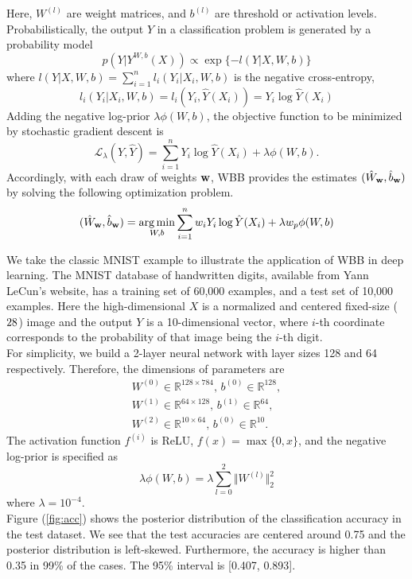 \documentclass[11pt]{article}%
\DeclareMathOperator*{\argmin}{arg\,min} %
\begin{document}
\noindent Here, $W^{(l)}$ are weight matrices, and $b^{(l)}$ are threshold or activation levels. Probabilistically, the output $Y$ in a classification problem is generated by a probability model 
$$
p(Y|Y^{W,b}(X)) \propto \exp\{-l(Y|X,W,b)\}
$$
where $l(Y|X,W,b) = \sum_{i=1}^{n}l_i(Y_i|X_i,W,b) $ is the  negative cross-entropy,
$$
l_i(Y_i|X_i,W,b) = l_i(Y_i, \hat{Y}(X_i)) = Y_i\log\hat{Y}(X_i)
$$
Adding the negative log-prior $\lambda\phi(W,b)$, the objective function to be minimized by stochastic gradient descent is 
$$
\mathcal{L}_\lambda(Y,\hat{Y}) = \sum_{i=1}^{n}Y_i\log\hat{Y}(X_i) + \lambda\phi(W,b).
$$
Accordingly, with each draw of weights ${\bf w}$, WBB provides the estimates $(\hat{W}_{\bf w}, \hat{b}_{\bf w})$ by solving the following optimization problem.
$$
(\hat{W}_{\bf w}, \hat{b}_{\bf w}) = \argmin_{W,b} \sum_{i=1}^{n}w_iY_i\log\hat{Y}(X_i) + \lambda w_p\phi(W,b)
$$

\noindent We take the classic MNIST example to illustrate the application of WBB in deep learning. The MNIST database of handwritten digits, available from Yann LeCun's website, has a training set of 60,000 examples, and a test set of 10,000 examples. Here the high-dimensional $X$ is a normalized and centered fixed-size ($28\time 28$) image and the output $Y$ is a 10-dimensional vector, where $i$-th coordinate corresponds to the probability of that image being the $i$-th digit.\\

\noindent For simplicity, we build a 2-layer neural network with layer sizes 128 and 64 respectively. Therefore, the dimensions of parameters are
\begin{align*}
W^{(0)} \in \mathbb{R}^{128\times 784},\, b^{(0)}\in \mathbb{R}^{128},\\
W^{(1)} \in \mathbb{R}^{64\times 128},\, b^{(1)}\in \mathbb{R}^{64},\\
W^{(2)} \in \mathbb{R}^{10\times 64},\, b^{(0)}\in \mathbb{R}^{10}.
\end{align*}
The activation function $f^{(i)}$ is ReLU, $f(x) = \max\{0,x\}$, and the negative log-prior is specified as 
$$
\lambda\phi(W,b) = \lambda\sum_{l=0}^{2}\Vert W^{(l)} \Vert_2^2
$$
where $\lambda = 10^{-4}$. \\

\noindent Figure (\ref{fig:acc}) shows the posterior distribution of the classification accuracy in the test dataset. We see that the test accuracies are centered around 0.75 and the posterior distribution is left-skewed. Furthermore, the accuracy is higher than 0.35 in 99\% of the cases. The 95\% interval is [0.407, 0.893].
\end{document}
